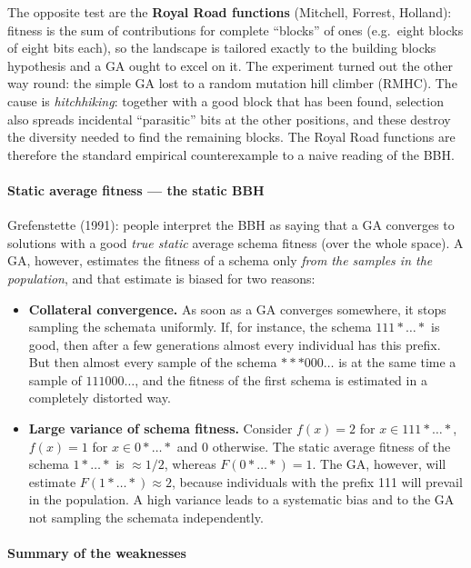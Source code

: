 \documentclass[11pt,a4paper]{article}
\theoremstyle{definition}
\providecommand{\uv}[1]{``#1''}
\begin{document}
The opposite test are the \textbf{Royal Road functions} (Mitchell, Forrest,
Holland): fitness is the sum of contributions for complete \uv{blocks} of ones
(e.g.\ eight blocks of eight bits each), so the landscape is tailored exactly to
the building blocks hypothesis and a GA ought to excel on it. The experiment
turned out the other way round: the simple GA lost to a random mutation hill
climber (RMHC). The cause is \emph{hitchhiking}: together with a good block that
has been found, selection also spreads incidental \uv{parasitic} bits at the
other positions, and these destroy the diversity needed to find the remaining
blocks. The Royal Road functions are therefore the standard empirical
counterexample to a naive reading of the BBH.

\paragraph{Static average fitness --- the static BBH}

Grefenstette (1991): people interpret the BBH as saying that a GA converges to
solutions with a good \emph{true static} average schema fitness (over the whole
space). A GA, however, estimates the fitness of a schema only \emph{from the
samples in the population}, and that estimate is biased for two reasons:

\begin{itemize}
\item \textbf{Collateral convergence.} As soon as a GA converges somewhere, it
  stops sampling the schemata uniformly. If, for instance, the schema
  $111{*}\ldots{*}$ is good, then after a few generations almost every
  individual has this prefix. But then almost every sample of the schema
  ${*}{*}{*}000\ldots$ is at the same time a sample of $111000\ldots$, and the
  fitness of the first schema is estimated in a completely distorted way.
\item \textbf{Large variance of schema fitness.} Consider $f(x) = 2$ for
  $x \in 111{*}\ldots{*}$, $f(x)=1$ for $x \in 0{*}\ldots{*}$ and $0$ otherwise.
  The static average fitness of the schema $1{*}\ldots{*}$ is $\approx 1/2$,
  whereas $F(0{*}\ldots{*}) = 1$. The GA, however, will estimate
  $F(1{*}\ldots{*}) \approx 2$, because individuals with the prefix 111 will
  prevail in the population. A high variance leads to a systematic bias and to
  the GA not sampling the schemata independently.
\end{itemize}

\paragraph{Summary of the weaknesses}
\end{document}
